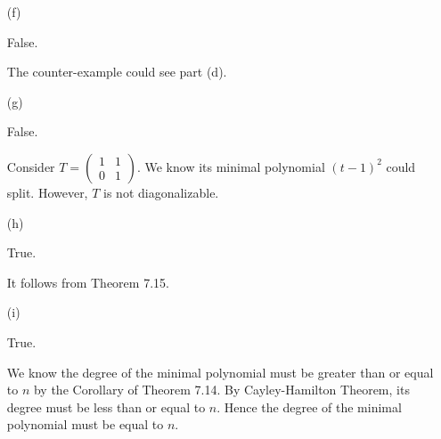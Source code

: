 \begin{Exercise}
\begin{enumerate}[(a)]
\item[(f)]
\begin{answer}
False.
\end{answer}
\begin{solution}
The counter-example could see part (d).
\end{solution}

\item[(g)]
\begin{answer}
False.
\end{answer}
\begin{solution}
Consider $T = \begin{pmatrix}
1 & 1 \\
0 & 1
\end{pmatrix}$. We know its minimal polynomial $(t-1)^2$ could split.
However, $T$ is not diagonalizable.
\end{solution}

\item[(h)]
\begin{answer}
True.
\end{answer}
\begin{solution}
It follows from Theorem 7.15.
\end{solution}

\item[(i)]
\begin{answer}
True.
\end{answer}
\begin{solution}
We know the degree of the minimal polynomial must be greater than or equal to $n$ by the Corollary of Theorem 7.14.
By Cayley-Hamilton Theorem, its degree must be less than or equal to $n$.
Hence the degree of the minimal polynomial must be equal to $n$.
\end{solution}

\end{enumerate}
\end{Exercise}